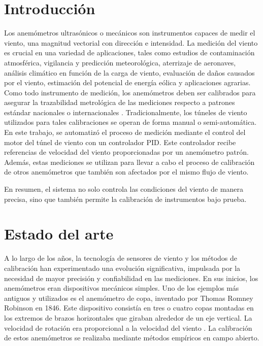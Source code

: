 \section{Introducción}

Los anemómetros ultrasónicos o mecánicos son instrumentos capaces de medir el viento, una magnitud vectorial con dirección e intensidad. La medición del viento es crucial en una variedad de aplicaciones, tales como estudios de contaminación atmosférica, vigilancia y predicción meteorológica, aterrizaje de aeronaves, análisis climático en función de la carga de viento, evaluación de daños causados por el viento, estimación del potencial de energía eólica y aplicaciones agrarias. Como todo instrumento de medición, los anemómetros deben ser calibrados para asegurar la trazabilidad metrológica de las mediciones respecto a patrones estándar nacionales o internacionales \cite{wmoChapter8}. Tradicionalmente, los túneles de viento utilizados para tales calibraciones se operan de forma manual o semi-automática. En este trabajo, se automatizó el proceso de medición mediante el control del motor del túnel de viento con un controlador PID. Este controlador recibe referencias de velocidad del viento proporcionadas por un anemómetro patrón. Además, estas mediciones se utilizan para llevar a cabo el proceso de calibración de otros anemómetros que también son afectados por el mismo flujo de viento.

En resumen, el sistema no solo controla las condiciones del viento de manera precisa, sino que también permite la calibración de instrumentos bajo prueba.

\section{Estado del arte}\label{sec:estado_del_arte}
A lo largo de los años, la tecnología de sensores de viento y los métodos de calibración han experimentado una evolución significativa, impulsada por la necesidad de mayor precisión y confiabilidad en las mediciones. En sus inicios, los anemómetros eran dispositivos mecánicos simples. Uno de los ejemplos más antiguos y utilizados es el anemómetro de copa, inventado por Thomas Romney Robinson en 1846. Este dispositivo consistía en tres o cuatro copas montadas en los extremos de brazos horizontales que giraban alrededor de un eje vertical. La velocidad de rotación era proporcional a la velocidad del viento \cite{robinson1846}. La calibración de estos anemómetros se realizaba mediante métodos empíricos en campo abierto.

